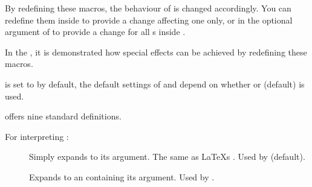 \documentclass[12pt]{scrartcl}
\let\newslide=\relax
\begin{document}
  By redefining these macros, the behaviour of  is changed accordingly. You can redefine them inside
   to provide a change affecting one  only, or in the optional argument of
   to provide a change for all s inside .

  In the , it is demonstrated how special effects can be achieved by redefining these macros.

   is set to  by default, the default settings of
   and  depend on whether  or
   (default) is used.

  \newslide

   offers nine standard definitions.

  For interpreting :
  \begin{description}
  \item[]
    Simply expands to its argument. The same as \LaTeX s
    . Used by  (default).

  \item[]
    Expands to an  containing its argument. Used by
    .
  \end{description}

  \newslide
\end{document}
